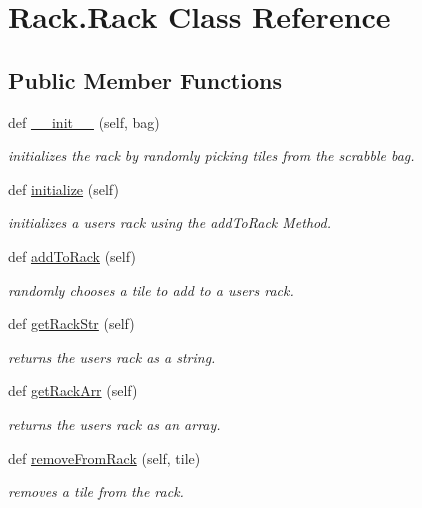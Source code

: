 \hypertarget{class_rack_1_1_rack}{}\section{Rack.\+Rack Class Reference}
\label{class_rack_1_1_rack}
\subsection*{Public Member Functions}
\begin{DoxyCompactItemize}
\item 
def \hyperlink{class_rack_1_1_rack_aa94c480c8e59818b31e429bceb2be401}{\+\_\+\+\_\+init\+\_\+\+\_\+} (self, bag)
\begin{DoxyCompactList}\small\item\em initializes the rack by randomly picking tiles from the scrabble bag. \end{DoxyCompactList}\item 
def \hyperlink{class_rack_1_1_rack_a088c75c1dd0faf756e73155d80393b45}{initialize} (self)
\begin{DoxyCompactList}\small\item\em initializes a users rack using the add\+To\+Rack Method. \end{DoxyCompactList}\item 
def \hyperlink{class_rack_1_1_rack_ae0060496cb23bf03ec4dad788fb8a537}{add\+To\+Rack} (self)
\begin{DoxyCompactList}\small\item\em randomly chooses a tile to add to a users rack. \end{DoxyCompactList}\item 
def \hyperlink{class_rack_1_1_rack_a955710ff8411511fe06d1390bdf06097}{get\+Rack\+Str} (self)
\begin{DoxyCompactList}\small\item\em returns the users rack as a string. \end{DoxyCompactList}\item 
def \hyperlink{class_rack_1_1_rack_a274661a79d56e201ea873238894180e8}{get\+Rack\+Arr} (self)
\begin{DoxyCompactList}\small\item\em returns the users rack as an array. \end{DoxyCompactList}\item 
def \hyperlink{class_rack_1_1_rack_a67086c96db03aae607ab3c8cd9d708af}{remove\+From\+Rack} (self, tile)
\begin{DoxyCompactList}\small\item\em removes a tile from the rack. \end{DoxyCompactList}\item 

\end{DoxyCompactItemize}
